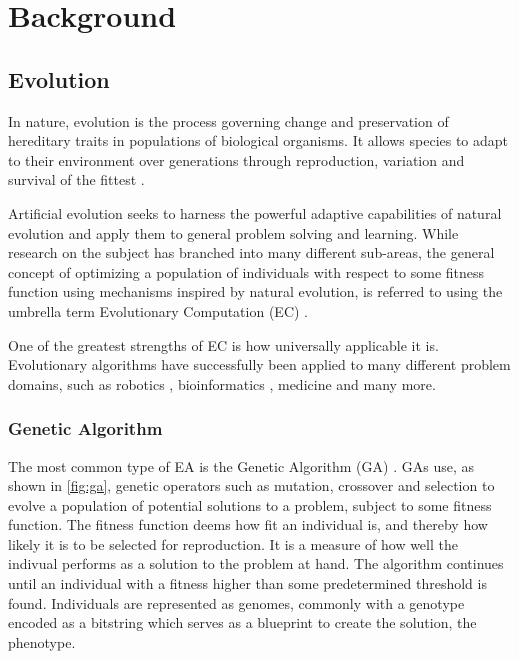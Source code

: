 
\chapter{Background}
\label{chp:background}


\section{Evolution}
\label{sec:evolution}

In nature, evolution is the process governing change and preservation of
hereditary traits in populations of biological organisms. It allows species to
adapt to their environment over generations through reproduction, variation and
survival of the fittest \cite{Darwin1859}.

Artificial evolution seeks to harness the powerful adaptive capabilities of
natural evolution and apply them to general problem solving and learning. While
research on the subject has branched into many different sub-areas, the general
concept of optimizing a population of individuals with respect to some fitness
function using mechanisms inspired by natural evolution, is referred to using
the umbrella term Evolutionary Computation (EC) \cite{Back1997}.

One of the greatest strengths of EC is how universally applicable it is.
Evolutionary algorithms have successfully been applied to many different problem
domains, such as robotics \cite{Floreano2000}, bioinformatics
\cite{KosakovskyPond2006}, medicine \cite{Fitzgerald:2015:IAS:2739480.2754761}
and many more.

\subsection{Genetic Algorithm}

The most common type of EA is the Genetic Algorithm (GA)
\cite{Goldberg:1989:GAS:534133}. GAs use, as shown in \ref{fig:ga}, genetic
operators such as mutation, crossover and selection to evolve a population of
potential solutions to a problem, subject to some fitness function. The fitness
function deems how fit an individual is, and thereby how likely it is to be
selected for reproduction. It is a measure of how well the indivual performs as
a solution to the problem at hand. The algorithm continues until an individual
with a fitness higher than some predetermined threshold is found. Individuals
are represented as genomes, commonly with a genotype encoded as a bitstring
which serves as a blueprint to create the solution, the phenotype.

